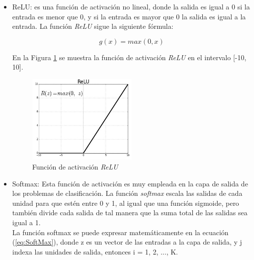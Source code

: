 \begin{itemize}
        \begin{itemize}
            \item ReLU: es una función de activación no lineal, donde la salida es igual a 0 si la entrada es menor que 0, y si la entrada es mayor que 0 la salida es igual a la entrada. La función \textit{ReLU} sigue la siguiente fórmula:
            
            \begin{equation}\label{eq:relu}
		        g(x)=max(0,x)
            \end{equation}
            
            En la Figura \ref{fig.relu} se muestra la función de activación \textit{ReLU} en el intervalo [-10, 10].
            
            \begin{figure}[H]
              \begin{center}
                \includegraphics[width=0.5\textwidth]{figures/Estado_arte/relu.png}
            		\caption{Función de activación \textit{ReLU}}
            		\label{fig.relu}
            		\end{center}
            \end{figure}
                        
            \item Softmax: Esta función de activación es muy empleada en la capa de salida de los problemas de clasificación. La función \textit{softmax} escala las salidas de cada unidad para que estén entre 0 y 1, al igual que una función sigmoide, pero también divide cada salida de tal manera que la suma total de las salidas sea igual a 1.\\
            
            La función softmax se puede expresar matemáticamente en la ecuación (\ref{eq:SoftMax}), donde z es un vector de las entradas a la capa de salida, y j indexa las unidades de salida, entonces i = 1, 2, ..., K.
            

\end{itemize}
\end{itemize}
